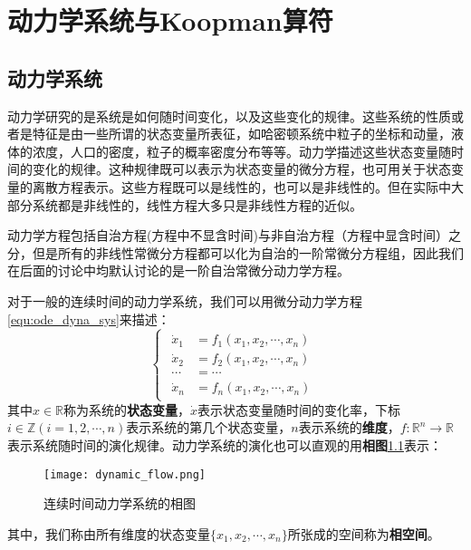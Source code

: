 \chapter{动力学系统与Koopman算符}

\section{动力学系统}
动力学研究的是系统是如何随时间变化，以及这些变化的规律。这些系统的性质或者是特征是由一些所谓的状态变量所表征，如哈密顿系统中粒子的坐标和动量，液体的浓度，人口的密度，粒子的概率密度分布等等。动力学描述这些状态变量随时间的变化的规律。这种规律既可以表示为状态变量的微分方程，也可用关于状态变量的离散方程表示。这些方程既可以是线性的，也可以是非线性的。但在实际中大部分系统都是非线性的，线性方程大多只是非线性方程的近似。

动力学方程包括自治方程(方程中不显含时间)与非自治方程（方程中显含时间）之分，但是所有的非线性常微分方程都可以化为自治的一阶常微分方程组，因此我们在后面的讨论中均默认讨论的是一阶自治常微分动力学方程。

对于一般的连续时间的动力学系统，我们可以用微分动力学方程\eqref{equ:ode_dyna_sys}来描述：
\begin{equation}
    \begin{cases}
        \begin{aligned}
            \dot{x}_1 &= f_1(x_1,x_2,\cdots,x_n)\\
            \dot{x}_2 &= f_2(x_1,x_2,\cdots,x_n)\\
            \cdots &= \cdots \\
            \dot{x}_n &= f_n(x_1,x_2,\cdots,x_n)
        \end{aligned}
    \end{cases}\label{equ:ode_dyna_sys}
\end{equation}
其中$x\in \mathbb{R}$称为系统的\textbf{状态变量}，$\dot{x}$表示状态变量随时间的变化率，下标$i\in \mathbb{Z}(i=1,2,\cdots,n)$表示系统的第几个状态变量，$n$表示系统的\textbf{维度}，$f:\mathbb{R}^n\rightarrow\mathbb{R}$表示系统随时间的演化规律。动力学系统的演化也可以直观的用\textbf{相图}\ref{fig:pha_spa}表示：
\begin{figure}
	\centering
	\texttt{[image: dynamic\_flow.png]}
    \caption{连续时间动力学系统的相图}
    \label{fig:pha_spa}
\end{figure}
其中，我们称由所有维度的状态变量$\{x_1,x_2,\cdots,x_n\}$所张成的空间称为\textbf{相空间}。

